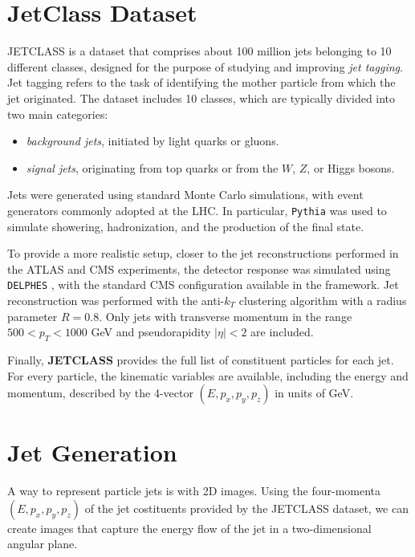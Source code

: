 \section{JetClass Dataset}

JETCLASS \cite{qu2024particletransformerjettagging} is a dataset that comprises about 100 million jets belonging to 10 different classes, designed for the purpose of studying and improving \textit{jet tagging}.  
Jet tagging refers to the task of identifying the mother particle from which the jet originated.  
The dataset includes 10 classes, which are typically divided into two main categories:
\begin{itemize}
    \item \textit{background jets}, initiated by light quarks or gluons.
    \item \textit{signal jets}, originating from top quarks or from the $W$, $Z$, or Higgs bosons.
\end{itemize}

Jets were generated using standard Monte Carlo simulations, with event generators commonly adopted at the LHC. In particular, \texttt{Pythia}  was used to simulate showering, hadronization, and the production of the final state.  

To provide a more realistic setup, closer to the jet reconstructions performed in the ATLAS\cite{Aad:2008zzm} and CMS \cite{:2008zzk} experiments, the detector response was simulated using \texttt{DELPHES} \cite{ovyn2010delphesframeworkfastsimulation}, with the standard CMS configuration available in the framework.  
Jet reconstruction was performed with the anti-$k_{T}$ clustering algorithm with a radius parameter $R=0.8$. Only jets with transverse momentum in the range $500 < p_T < 1000$ GeV and pseudorapidity $|\eta| < 2$ are included. 

Finally, \textbf{JETCLASS} provides the full list of constituent particles for each jet. For every particle, the kinematic variables are available, including the energy and momentum, described by the 4-vector $(E, p_x, p_y, p_z)$ in units of GeV.

\section{Jet Generation}
A way to represent particle jets is with 2D images. Using the four-momenta $(E, p_x, p_y, p_z)$ of the jet costituents provided by the JETCLASS dataset, we can create images that capture the energy flow of the jet in a two-dimensional angular plane. 
 
